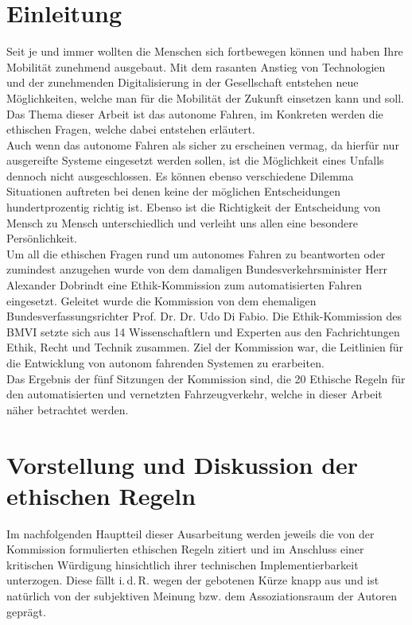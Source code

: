 \documentclass[twoside,a4paper,12pt]{article}
\begin{document}
\section{Einleitung} \label{Einleitung}
Seit je und immer wollten die Menschen sich fortbewegen können und haben Ihre Mobilität zunehmend ausgebaut. Mit dem rasanten Anstieg von Technologien und der zunehmenden Digitalisierung in der Gesellschaft entstehen neue Möglichkeiten, welche man für die Mobilität der Zukunft einsetzen kann und soll. Das Thema dieser Arbeit ist das autonome Fahren, im Konkreten werden die ethischen Fragen, welche dabei entstehen erläutert. \\ Auch wenn das autonome Fahren als sicher zu erscheinen vermag, da hierfür nur ausgereifte Systeme eingesetzt werden sollen, ist die Möglichkeit eines Unfalls dennoch nicht ausgeschlossen. Es können ebenso verschiedene Dilemma Situationen auftreten bei denen keine der möglichen Entscheidungen hundertprozentig richtig ist. Ebenso ist die Richtigkeit der Entscheidung von Mensch zu Mensch unterschiedlich und verleiht uns allen eine besondere Persönlichkeit. \\ Um all die ethischen Fragen rund um autonomes Fahren zu beantworten oder zumindest anzugehen wurde von dem damaligen Bundesverkehrsminister Herr Alexander Dobrindt eine Ethik-Kommission zum automatisierten Fahren eingesetzt. Geleitet wurde die Kommission von dem ehemaligen Bundesverfassungsrichter Prof. Dr. Dr. Udo Di Fabio. Die Ethik-Kommission des BMVI setzte sich aus 14 Wissenschaftlern und Experten aus den Fachrichtungen Ethik, Recht und Technik zusammen. \cite{bmvi1} Ziel der Kommission war, die Leitlinien für die Entwicklung von autonom fahrenden Systemen zu erarbeiten. \\
Das Ergebnis der fünf Sitzungen der Kommission sind, die 20 Ethische Regeln für den automatisierten
und vernetzten Fahrzeugverkehr, welche in dieser Arbeit näher betrachtet werden. 

\newpage

\tableofcontents

\newpage

\mainmatter

\cleardoublepage
\section{Vorstellung und Diskussion der ethischen Regeln} \label{VorstellungUndDiskussionDerEthischenRegeln}

Im nachfolgenden Hauptteil dieser Ausarbeitung werden jeweils die von der Kommission formulierten ethischen Regeln zitiert und im Anschluss einer kritischen 
Würdigung hinsichtlich ihrer technischen Implementierbarkeit unterzogen. Diese fällt i.\,d.\,R. wegen der gebotenen Kürze knapp aus und ist natürlich
von der subjektiven Meinung bzw. dem Assoziationsraum der Autoren geprägt. 
\end{document}

